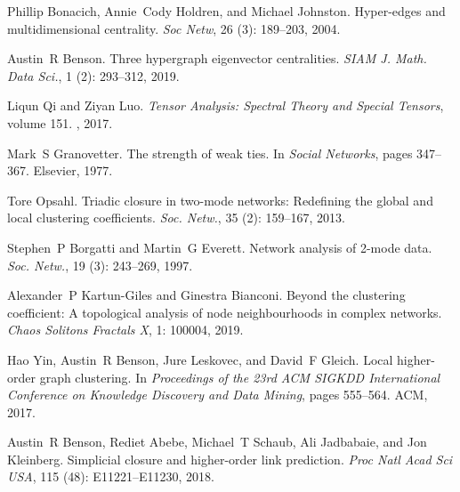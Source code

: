 Phillip Bonacich, Annie~Cody Holdren, and Michael Johnston.
\newblock Hyper-edges and multidimensional centrality.
\newblock \emph{Soc Netw}, 26 (3): 189--203, 2004.

Austin~R Benson.
\newblock Three hypergraph eigenvector centralities.
\newblock \emph{SIAM J. Math. Data Sci.}, 1 (2): 293--312,
2019.

Liqun Qi and Ziyan Luo.
\newblock \emph{Tensor Analysis: Spectral Theory and Special Tensors}, volume
151.
, 2017.

Mark~S Granovetter.
\newblock The strength of weak ties.
\newblock In \emph{Social Networks}, pages 347--367. {Elsevier}, 1977.

Tore Opsahl.
\newblock Triadic closure in two-mode networks: {{Redefining}} the global and
local clustering coefficients.
\newblock \emph{Soc. Netw.}, 35 (2): 159--167, 2013.

Stephen~P Borgatti and Martin~G Everett.
\newblock Network analysis of 2-mode data.
\newblock \emph{Soc. Netw.}, 19 (3): 243--269, 1997.

Alexander~P {Kartun-Giles} and Ginestra Bianconi.
\newblock Beyond the clustering coefficient: {{A}} topological analysis of node
neighbourhoods in complex networks.
\newblock \emph{Chaos Solitons Fractals X}, 1: 100004, 2019.

Hao Yin, Austin~R Benson, Jure Leskovec, and David~F Gleich.
\newblock Local higher-order graph clustering.
\newblock In \emph{Proceedings of the 23rd {{ACM SIGKDD}} International
    Conference on Knowledge Discovery and Data Mining}, pages 555--564. {ACM},
2017.

Austin~R Benson, Rediet Abebe, Michael~T Schaub, Ali Jadbabaie, and Jon
Kleinberg.
\newblock Simplicial closure and higher-order link prediction.
\newblock \emph{Proc Natl Acad Sci USA}, 115 (48):
E11221--E11230, 2018.

